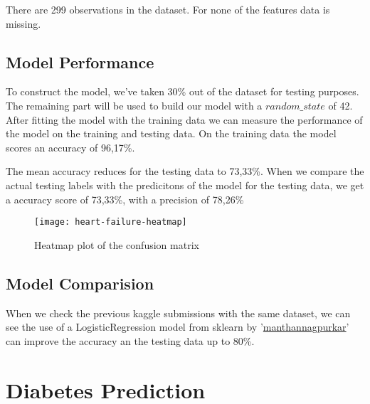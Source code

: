 \noindent There are 299 observations in the dataset. For none of the features data is missing.

\subsection{Model Performance}

To construct the model, we've taken 30\% out of the dataset for testing purposes. The remaining part will be used to build our model with a $random\_state$ of 42. After fitting the model with the training data we can measure the performance of the model on the training and testing data. On the training data the model scores an accuracy of 96,17\%.

The mean accuracy reduces for the testing data to 73,33\%. When we compare the actual testing labels with the predicitons of the model for the testing data, we get a accuracy score of 73,33\%, with a precision of 78,26\%

\begin{figure}[t]
  \begin{center}
    \texttt{[image: heart-failure-heatmap]}
    \caption{Heatmap plot of the confusion matrix}
  \end{center}
\end{figure}


\subsection{Model Comparision}

When we check the previous kaggle submissions with the same dataset, we can see the use of a LogisticRegression model from sklearn by '\href{https://www.kaggle.com/manthannagpurkar/heart-failure-prediction}{manthannagpurkar}' can improve the accuracy an the testing data up to 80\%.


\section{Diabetes Prediction}
\newcommand{\linkLogisticRegression}{https://scikit-learn.org/stable/modules/generated/sklearn.linear\_model.LogisticRegression.html}
\newcommand{\linkGaussianNB}{https://scikit-learn.org/stable/modules/generated/sklearn.naive\_bayes.GaussianNB.html?highlight=gaussiannb}
\newcommand{\linkRandomForestClassifier}{https://scikit-learn.org/stable/modules/generated/sklearn.ensemble.RandomForestClassifier.html?highlight=randomforestclassifier}



